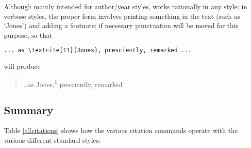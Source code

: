 Although mainly intended for author/year styles,  works
rationally in any style; in verbose styles, the proper form involves
printing something in the text (such as `Jones') and adding a
footnote; if necessary punctuation will be moved for this purpose, so
that
\begin{Verbatim}
... as \textcite[11]{Jones}, presciently, remarked ...
\end{Verbatim}
will produce 
\begin{quote}
  \dots as
  Jones\colorbox{red!30}{,\textsuperscript{1}}
  presciently, remarked
\end{quote}

\subsection{Summary}

Table \ref{allcitations} shows how the various citation commands
operate with the various different standard styles.

